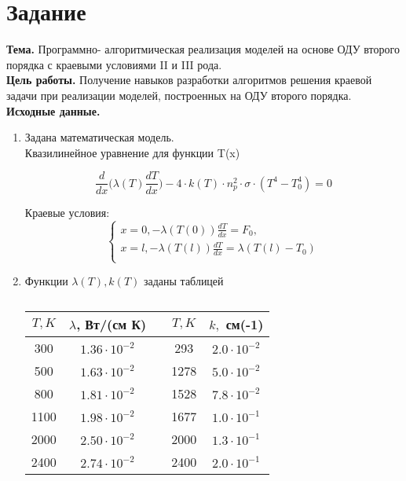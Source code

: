 \chapter*{Задание}

\textbf{Тема. } Программно- алгоритмическая реализация моделей на основе ОДУ второго порядка
с краевыми условиями II и III рода.\\

\textbf{Цель работы. } Получение навыков разработки алгоритмов решения краевой задачи при
реализации моделей, построенных на ОДУ второго порядка. \\

\textbf{Исходные данные. }\\
\begin{enumerate}
	\item Задана математическая модель. \\
	Квазилинейное уравнение для функции T(x)
	
	\begin{equation}\label{formula1}
		\frac{d}{dx}\bigg(\lambda(T)\frac{dT}{dx}\bigg) - 4 \cdot k(T) \cdot n_p^{2} \cdot \sigma \cdot (T^4 - T_0^4) = 0
	\end{equation}

	Краевые условия:
	\begin{equation}\label{formula2}
		\left\{
		\begin{array}{ccc}
			x = 0, -\lambda(T(0))\frac{dT}{dx} = F_0,\\
			x = l, -\lambda(T(l))\frac{dT}{dx} = \lambda(T(l) - T_0) \\
		\end{array}
		\right.
	\end{equation}

	\item Функции $\lambda(T), k(T)$ заданы таблицей
	\begin{table}[ph!]\label{table_1}
		\caption{}
		\centering
		\begin{tabular}{|c|c|c|c|c|}
			\hline
			$T, K$ & $\lambda$, Вт/(см К) & & $T, K$ & $k,$ см(-1)\\
			\hline
			300 & $1.36 \cdot 10^{-2}$ && 293 & $2.0 \cdot 10^{-2}$\\
			\hline
			500 & $1.63 \cdot 10^{-2}$ && 1278 & $5.0 \cdot 10^{-2}$\\
			\hline
			800 & $1.81 \cdot 10^{-2}$ && 1528 & $7.8 \cdot 10^{-2}$ \\
			\hline
			1100 & $1.98 \cdot 10^{-2}$ && 1677 & $1.0 \cdot 10^{-1}$ \\
			\hline
			2000 & $2.50 \cdot 10^{-2}$ && 2000 & $1.3 \cdot 10^{-1}$ \\
			\hline
			2400 & $2.74 \cdot 10^{-2}$ && 2400 & $2.0 \cdot 10^{-1}$ \\
			\hline
	

\end{tabular}
\end{table}
\end{enumerate}
